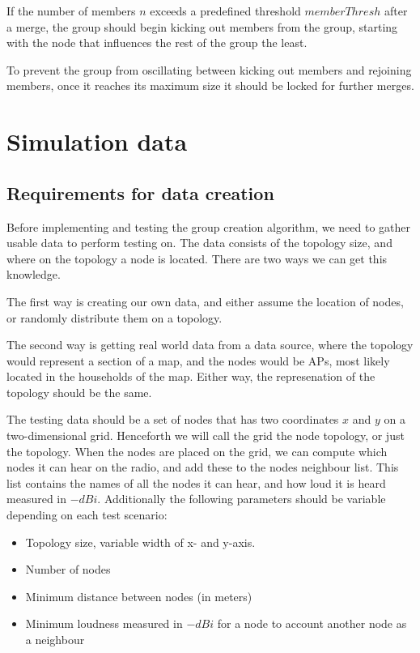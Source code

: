 \documentclass[a4paper,UKenglish]{report}
\begin{document}
If the number of members $n$ exceeds a predefined threshold $memberThresh$ after a merge, the group should begin kicking out members from the group, starting with the node
that influences the rest of the group the least. 

To prevent the group from oscillating between kicking out members and rejoining members, once it reaches
its maximum size it should be locked for further merges. 

\section{Simulation data} \label{simdata}

\subsection{Requirements for data creation}
Before implementing and testing the group creation algorithm, we need to gather usable data to perform testing on.
The data consists of the topology size, and where on the topology a node is located. There are two ways we can get this knowledge.

The first way is creating our own data, and either assume the location of nodes,
or randomly distribute them on a topology.

The second way is getting real world data from a data source, where the topology would represent a section of a map, and the nodes would be APs,
most likely located in the households of the map.
Either way, the represenation of the topology should be the same. 

The testing data should be a set of nodes that has two coordinates $x$ and $y$ on a two-dimensional grid. Henceforth we will call the grid 
the node topology, or just the topology. When the nodes are placed on the
grid, we can compute which nodes it can hear on the radio, and add these to the nodes neighbour list. This list contains the
names of all the nodes it can hear, and how loud it is heard measured in $-dBi$. Additionally
the following parameters should be variable depending on each test scenario:
\begin{itemize}
	\item Topology size, variable width of x- and y-axis.
	\item Number of nodes
	\item Minimum distance between nodes (in meters)
	\item Minimum loudness measured in $-dBi$ for a node to account another node as a neighbour
\end{itemize}
\end{document}
